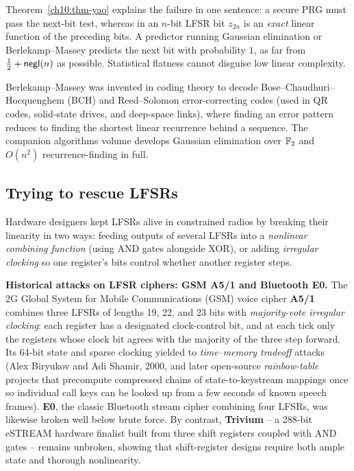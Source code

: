 \begin{whybox}
Theorem~\ref{ch10:thm-yao} explains the failure in one sentence: a secure PRG must pass the next-bit test, whereas in an $n$-bit LFSR bit $z_{2n}$ is an \emph{exact} linear function of the preceding bits. A predictor running Gaussian elimination or Berlekamp--Massey predicts the next bit with probability $1$, as far from $\tfrac12 + \mathsf{negl}(n)$ as possible. Statistical flatness cannot disguise low linear complexity.
\end{whybox}

\begin{connectionbox}
Berlekamp--Massey was invented in coding theory to decode Bose--Chaudhuri--Hocquenghem (BCH) and Reed--Solomon error-correcting codes (used in QR codes, solid-state drives, and deep-space links), where finding an error pattern reduces to finding the shortest linear recurrence behind a sequence. The companion algorithms volume develops Gaussian elimination over $\mathbb{F}_2$ and $O(n^2)$ recurrence-finding in full.
\end{connectionbox}

\subsection{Trying to rescue LFSRs}
\label{ch10:lfsr-rescue}

Hardware designers kept LFSRs alive in constrained radios by breaking their linearity in two ways: feeding outputs of several LFSRs into a \emph{nonlinear combining function} (using AND gates alongside XOR), or adding \emph{irregular clocking} so one register's bits control whether another register steps.

\begin{attackbox}
\textbf{Historical attacks on LFSR ciphers: GSM A5/1 and Bluetooth E0.} The 2G Global System for Mobile Communications (GSM) voice cipher \textbf{A5/1} combines three LFSRs of lengths 19, 22, and 23 bits with \emph{majority-vote irregular clocking}: each register has a designated clock-control bit, and at each tick only the registers whose clock bit agrees with the majority of the three step forward. Its 64-bit state and sparse clocking yielded to \emph{time--memory tradeoff} attacks (Alex Biryukov and Adi Shamir, 2000, and later open-source \emph{rainbow-table} projects that precompute compressed chains of state-to-keystream mappings once so individual call keys can be looked up from a few seconds of known speech frames). \textbf{E0}, the classic Bluetooth stream cipher combining four LFSRs, was likewise broken well below brute force. By contrast, \textbf{Trivium} -- a 288-bit eSTREAM hardware finalist built from three shift registers coupled with AND gates -- remains unbroken, showing that shift-register designs require both ample state and thorough nonlinearity.
\end{attackbox}

